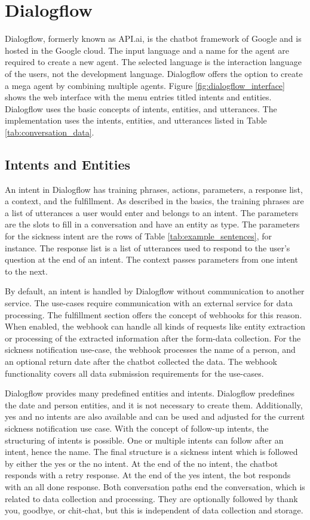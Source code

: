 \section{Dialogflow}
Dialogflow\cite{dialogflow}, formerly known as API.ai, is the chatbot framework of Google and is hosted in the Google cloud.
The input language and a name for the agent are required to create a new agent.
The selected language is the interaction language of the users, not the development language.
Dialogflow offers the option to create a mega agent by combining multiple agents.
Figure \ref{fig:dialogflow_interface} shows the web interface with the menu entries titled intents and entities.
Dialogflow uses the basic concepts of intents, entities, and utterances.
The implementation uses the intents, entities, and utterances listed in Table \ref{tab:conversation_data}.

\subsection{Intents and Entities}
An intent in Dialogflow has training phrases, actions, parameters,
a response list, a context, and the fulfillment.
As described in the basics, the training phrases are a list of utterances a user would enter and belongs to an intent.
The parameters are the slots to fill in a conversation and have an entity as type.
The parameters for the sickness intent are the rows of Table \ref{tab:example_sentences}, for instance.
The response list is a list of utterances used to respond to the user's question at the end of an intent.
The context passes parameters from one intent to the next.

By default, an intent is handled by Dialogflow without communication to another service.
The use-cases require communication with an external service for data processing.
The fulfillment section offers the concept of webhooks for this reason.
When enabled, the webhook can handle all kinds of requests like entity extraction or processing of the extracted information after the form-data collection.
For the sickness notification use-case, the webhook processes the name of a person, and an optional return date after the chatbot collected the data.
The webhook functionality covers all data submission requirements for the use-cases.

Dialogflow provides many predefined entities and intents.
Dialogflow predefines the date and person entities, and it is not necessary to create them.
Additionally, yes and no intents are also available and can be used and 
adjusted for the current sickness notification use case.
With the concept of follow-up intents, the structuring of intents is possible.
One or multiple intents can follow after an intent, hence the name.
The final structure is a sickness intent which is followed by either 
the yes or the no intent.
At the end of the no intent, the chatbot responds with a retry response.
At the end of the yes intent, the bot responds with an all done response.
Both conversation paths end the conversation, which is related to data collection and processing.
They are optionally followed by thank you, goodbye, or chit-chat, but this is independent of data collection and storage. 

